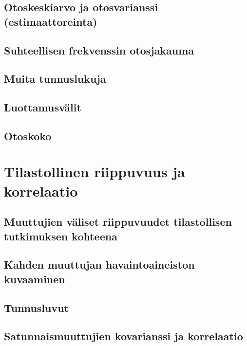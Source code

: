 \documentclass[
]{book}
\begin{document}
\hypertarget{alaluku63}{%
\section{Otoskeskiarvo ja otosvarianssi (estimaattoreinta)}\label{alaluku63}}

\hypertarget{alaluku64}{%
\section{Suhteellisen frekvenssin otosjakauma}\label{alaluku64}}

\hypertarget{alaluku65}{%
\section{Muita tunnuslukuja}\label{alaluku65}}

\hypertarget{alaluku66}{%
\section{Luottamusvälit}\label{alaluku66}}

\hypertarget{alaluku67}{%
\section{Otoskoko}\label{alaluku67}}

\hypertarget{luku7}{%
\chapter{Tilastollinen riippuvuus ja korrelaatio}\label{luku7}}

\hypertarget{alaluku71}{%
\section{Muuttujien väliset riippuvuudet tilastollisen tutkimuksen kohteena}\label{alaluku71}}

\hypertarget{alaluku72}{%
\section{Kahden muuttujan havaintoaineiston kuvaaminen}\label{alaluku72}}

\hypertarget{alaluku73}{%
\section{Tunnusluvut}\label{alaluku73}}

\hypertarget{alaluku74}{%
\section{Satunnaismuuttujien kovarianssi ja korrelaatio}\label{alaluku74}}
\end{document}

